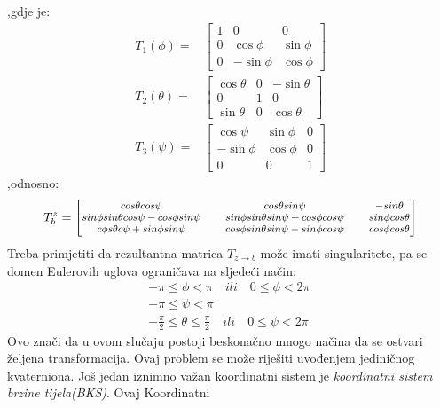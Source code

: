 ,gdje je:
\begin{align}
    T_1(\phi) =& \begin{bmatrix}
        1 & 0 & 0\\
        0 & \cos\phi & \sin\phi \\
        0 & -\sin\phi & \cos\phi 
    \end{bmatrix}\\
     T_2(\theta)=& \begin{bmatrix}
        \cos\theta & 0 & -\sin\theta \\
         0 & 1 & 0\\
         \sin\theta & 0 & \cos\theta
    \end{bmatrix}\\
    T_3(\psi) = &\begin{bmatrix}
        \cos\psi & \sin\phi & 0\\
        -\sin\phi & \cos\phi & 0\\
        0 & 0 & 1
    \end{bmatrix}
\end{align}
,odnosno:
\begin{equation}
    {\footnotesize
    T_{b}^z=\begin{bmatrix}
        cos\theta cos\psi && cos\theta sin\psi && -sin\theta\\
        sin\phi sin\theta cos\psi-cos\phi sin\psi && sin\phi sin\theta sin\psi +cos\phi cos\psi&& sin\phi cos\theta\\
        c\phi s\theta c\psi+sin\phi sin\psi && cos\phi sin\theta sin\psi -sin\phi cos\psi&& cos\phi cos\theta\\
    \end{bmatrix}}
    \label{eq:ztob}
\end{equation}
Treba primjetiti da rezultantna matrica $T_{z \to b}$ može imati singularitete, pa se domen
Eulerovih uglova ograničava na sljedeći način:
\begin{align*}
    -\pi \leq \phi <\pi \quad ili \quad 0\leq\phi<2\pi \\
    -\pi \leq \psi <\pi \qquad \qquad \qquad \qquad \\
    -\frac{\pi}{2}\leq \theta \leq \frac{\pi}{2} \quad ili \quad 0\leq\psi<2\pi
\end{align*}
Ovo znači da u ovom slučaju postoji beskonačno mnogo načina da se ostvari željena transformacija.
Ovaj problem se može riješiti uvođenjem jediničnog kvaterniona.
Još jedan iznimno važan koordinatni sistem je \textit{koordinatni sistem brzine tijela(BKS)}. Ovaj Koordinatni
